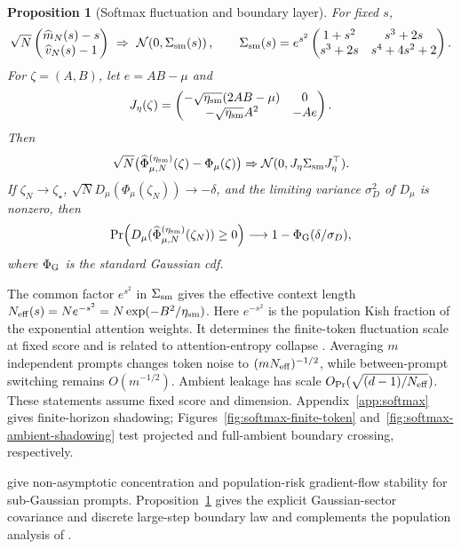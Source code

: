 \documentclass[11pt]{article}
\newtheorem{proposition}[theorem]{Proposition}
\begin{document}
\begin{proposition}[Softmax fluctuation and boundary layer]
\label{prop:softmax-clt}
For fixed \(s\),
\[
\sqrt N
\begin{pmatrix}\widehat m_N(s)-s\\ \widehat v_N(s)-1\end{pmatrix}
\ \Rightarrow\
\mathcal N\!\left(0,\Sigma_{\rm sm}(s)\right),\qquad
\Sigma_{\rm sm}(s)
=e^{s^2}
\begin{pmatrix}
1+s^2&s^3+2s\\
s^3+2s&s^4+4s^2+2
\end{pmatrix}.
\]
For \(\zeta=(A,B)\), let \(e=AB-\mu\) and
\[
J_\eta(\zeta)=
\begin{pmatrix}
-\sqrt{\eta_{\rm sm}}(2AB-\mu)&0\\
-\sqrt{\eta_{\rm sm}}A^2&-Ae
\end{pmatrix}.
\]
Then
\[
\sqrt N\bigl(\widehat\Phi_{\mu,N}^{(\eta_{\rm sm})}(\zeta)
-\Phi_\mu(\zeta)\bigr)
\Rightarrow
\mathcal N(0,J_\eta\Sigma_{\rm sm}J_\eta^\top).
\]
If \(\zeta_N\to\zeta_\star\),
\(\sqrt N D_\mu(\Phi_\mu(\zeta_N))\to-\delta\), and the limiting variance
\(\sigma_D^2\) of \(D_\mu\) is nonzero, then
\[
\Pr\!\left(D_\mu(
\widehat\Phi_{\mu,N}^{(\eta_{\rm sm})}(\zeta_N))\ge0\right)
\longrightarrow
1-\Phi_{\rm G}(\delta/\sigma_D),
\]
where \(\Phi_{\rm G}\) is the standard Gaussian cdf.
\end{proposition}

The common factor \(e^{s^2}\) in \(\Sigma_{\rm sm}\) gives the effective
context length
$N_{\rm eff}(s)=Ne^{-s^2}=N\exp(-B^2/\eta_{\rm sm})$.
Here \(e^{-s^2}\) is the population Kish fraction of the exponential
attention weights.  It determines the finite-token fluctuation scale at
fixed score and is related to attention-entropy collapse
\citep{zhai2023stabilizing}.  Averaging \(m\)
independent prompts changes token noise to
\((mN_{\rm eff})^{-1/2}\), while between-prompt switching remains
\(O(m^{-1/2})\).  Ambient leakage has scale
\(O_{\Pr}(\sqrt{(d-1)/N_{\rm eff}})\).  These statements assume fixed score
and dimension.  Appendix~\ref{app:softmax} gives
finite-horizon shadowing;
Figures~\ref{fig:softmax-finite-token}
and~\ref{fig:softmax-ambient-shadowing} test projected and full-ambient
boundary crossing, respectively.

\citet{boursier2026softmax} give non-asymptotic concentration and
population-risk gradient-flow stability for sub-Gaussian prompts.
Proposition~\ref{prop:softmax-clt} gives the explicit Gaussian-sector
covariance and discrete large-step boundary law and complements the
population analysis of \citet{goel2026training}.
\end{document}
